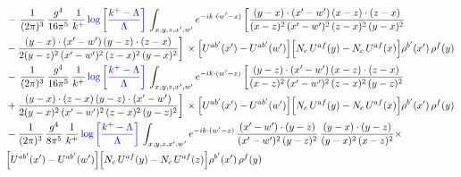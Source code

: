 \documentclass[10pt]{article}
\begin{document}
\begin{align}
& -\, \frac{1}{(2\pi)^{3}}\,\frac{g^{4}}{16\pi^{5}}\,\frac{1}{k^{+}}\,{\color{blue}\log{\left[\frac{k^{+}-\Lambda}{\Lambda}\right]}}\,\int_{x,y,z,x',w'}e^{-ik\cdot(w'-x)}\, \bigg[\frac{(y-x)\cdot (x'-w')\,(x-z)\cdot (z-x)}{(x-z)^{2}\,(x'-w')^{2}\,(z-x)^{2}\,(y-x)^{2}}\notag \\ & -\frac{(y-x)\cdot (x'-w')\,(y-z)\cdot (z-x)}{2(y-z)^{2}\,(x'-w')^{2}\,(z-x)^{2}\,(y-x)^{2}}\bigg]\,\times \Big[U^{ab'}(x')-U^{ab'}(w')\Big]\Big[N_{c}\,U^{af}(y)-N_{c}\,U^{af}(x)\Big]\rho^{b'}(x')\,\rho^{f}(y)\notag \\ & -\, \frac{1}{(2\pi)^{3}}\,\frac{g^{4}}{16\pi^{5}}\,\frac{1}{k^{+}}\,{\color{blue}\log{\left[\frac{k^{+}-\Lambda}{\Lambda}\right]}}\,\int_{x,y,z,x',w'}e^{-ik\cdot(w'-z)}\,\bigg[\frac{(y-z)\cdot (x'-w')\,(x-z)\cdot (z-x)}{(x-z)^{2}\,(x'-w')^{2}\,(z-x)^{2}\,(y-z)^{2}}\notag \\ & +\frac{(y-x)\cdot (z-x)\,(y-z)\cdot (x'-w')}{2(y-x)^{2}\,(x'-w')^{2}\,(z-x)^{2}\,(y-z)^{2}}\bigg]\,\times \Big[U^{ab'}(x')-U^{ab'}(w')\Big]\Big[N_{c}\,U^{af}(y)-N_{c}\,U^{af}(x)\Big]\rho^{b'}(x')\,\rho^{f}(y)\notag \\ & - \frac{1}{(2\pi)^{3}}\,\frac{g^{4}}{8\pi^{5}}\,\frac{1}{k^{+}}\,{\color{blue}\log{\left[\frac{k^{+}-\Lambda}{\Lambda}\right]}}\,\int_{x,y,z,x',w'}e^{-ik\cdot(w'-z)}\,\frac{(x'-w')\cdot(y-z)}{(x'-w')^{2}\,(y-z)^{2}}\,\frac{(y-x)\cdot(y-z)}{(y-x)^{2}\,(x-z)^{2}}\times\notag \\ & \Big[U^{ab'}(x')-U^{ab'}(w')\Big]\Big[N_{c}\,U^{af}(y)-N_{c}\,U^{af}(z)\Big]\rho^{b'}(x')\,\rho^{f}(y)
\end{align}
\end{document}
